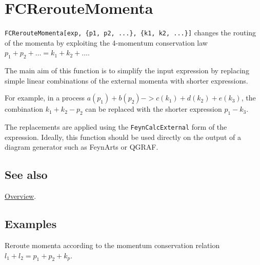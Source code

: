 \documentclass[../FeynCalcManual.tex]{subfiles}
\begin{document}
\hypertarget{fcreroutemomenta}{%
\section{FCRerouteMomenta}\label{fcreroutemomenta}}

\texttt{FCRerouteMomenta[\allowbreak{}exp,\ \allowbreak{}\{\allowbreak{}p1,\ \allowbreak{}p2,\ \allowbreak{}...\},\ \allowbreak{}\{\allowbreak{}k1,\ \allowbreak{}k2,\ \allowbreak{}...\}]}
changes the routing of the momenta by exploiting the 4-momentum
conservation law \(p_1+p_2+ \ldots = k_1+k_2+ \ldots\).

The main aim of this function is to simplify the input expression by
replacing simple linear combinations of the external momenta with
shorter expressions.

For example, in a process \(a(p_1) + b(p_2) -> c(k_1)+ d(k_2)+ e(k_3)\),
the combination \(k_1+k_2-p_2\) can be replaced with the shorter
expression \(p_1-k_3\).

The replacements are applied using the \texttt{FeynCalcExternal} form of
the expression. Ideally, this function should be used directly on the
output of a diagram generator such as FeynArts or QGRAF.

\subsection{See also}

\hyperlink{toc}{Overview}.

\subsection{Examples}

Reroute momenta according to the momentum conservation relation
\(l_1+l_2=p_1+p_2+k_p\).
\end{document}
